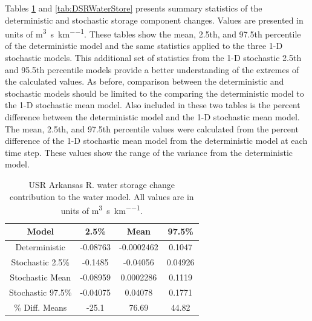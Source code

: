 \begin{linenumbers}
Tables \ref{tab:USRWaterStore} and \ref{tab:DSRWaterStore} presents summary statistics of the deterministic and stochastic storage component changes.  Values are presented in units of \si{\cubic\meter\per\second\per\kilo\meter}.   These tables show the mean, 2.5th, and 97.5th percentile of the deterministic model and the same statistics applied to the three 1-D stochastic models.  This additional set of statistics from the 1-D stochastic 2.5th and 95.5th percentile models provide a better understanding of the extremes of the calculated values.  As before, comparison between the deterministic and stochastic models should be limited to the comparing the deterministic model to the 1-D stochastic mean model.  Also included in these two tables is the percent difference between the deterministic model and the 1-D stochastic mean model.  The mean, 2.5th, and 97.5th percentile values were calculated from the percent difference of the 1-D stochastic mean model from the deterministic model at each time step.  These values show the range of the variance from the deterministic model.

\begin{table}[htbp]
\centering
\caption[USR Arkansas R. water storage change contribution to the water model.]{USR Arkansas R. water storage change contribution to the water model.  All values are in units of \si{\cubic\meter\per\second\per\kilo\meter}.}
\label{tab:USRWaterStore}
\begin{tabular}{c|ccc}
	\toprule
	Model& 2.5\% & Mean & 97.5\% \\
	\midrule
	\midrule
	Deterministic&		-0.08763&	-0.0002462&	0.1047\\
	\midrule				
	Stochastic 2.5\%&	-0.1485&	-0.04056&	0.04926\\
	Stochastic Mean&	-0.08959&	0.0002286&	0.1119\\ 
	Stochastic 97.5\%&	-0.04075&	0.04078&	0.1771\\ 
	\midrule                                        
	\% Diff. Means &	-25.1&	76.69&	44.82      \\
	\bottomrule
\end{tabular}
\end{table}


\end{linenumbers}
